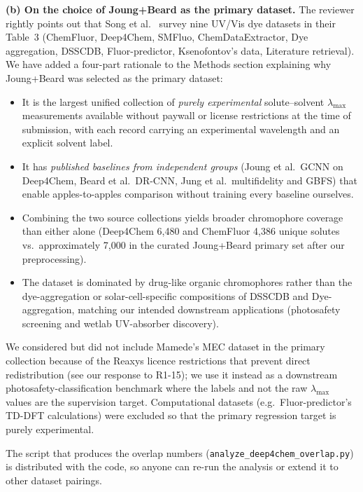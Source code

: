 \documentclass[11pt]{article}
\begin{document}
{\textbf{(b) On the choice of Joung+Beard as the primary dataset.} The reviewer rightly points out that Song et al.~\cite{song2025fluortools} survey nine UV/Vis dye datasets in their Table~3 (ChemFluor, Deep4Chem, SMFluo, ChemDataExtractor, Dye aggregation, DSSCDB, Fluor-predictor, Ksenofontov's data, Literature retrieval). We have added a four-part rationale to the Methods section explaining why Joung+Beard was selected as the primary dataset:
\begin{itemize}[leftmargin=2em,itemsep=2pt]
  \item It is the largest unified collection of \emph{purely experimental} solute--solvent $\lambda_{\max}$ measurements available without paywall or license restrictions at the time of submission, with each record carrying an experimental wavelength and an explicit solvent label.
  \item It has \emph{published baselines from independent groups} (Joung et al.\ GCNN on Deep4Chem, Beard et al.\ DR-CNN, Jung et al.\ multifidelity and GBFS) that enable apples-to-apples comparison without training every baseline ourselves.
  \item Combining the two source collections yields broader chromophore coverage than either alone (Deep4Chem 6{,}480 and ChemFluor 4{,}386 unique solutes vs.\ approximately 7{,}000 in the curated Joung+Beard primary set after our preprocessing).
  \item The dataset is dominated by drug-like organic chromophores rather than the dye-aggregation or solar-cell-specific compositions of DSSCDB and Dye-aggregation, matching our intended downstream applications (photosafety screening and wetlab UV-absorber discovery).
\end{itemize}
We considered but did not include Mamede's MEC dataset in the primary collection because of the Reaxys licence restrictions that prevent direct redistribution (see our response to R1-15); we use it instead as a downstream photosafety-classification benchmark where the labels and not the raw $\lambda_{\max}$ values are the supervision target. Computational datasets (e.g.\ Fluor-predictor's TD-DFT calculations) were excluded so that the primary regression target is purely experimental.

The script that produces the overlap numbers (\texttt{analyze\_deep4chem\_overlap.py}) is distributed with the code, so anyone can re-run the analysis or extend it to other dataset pairings.}
\end{document}
